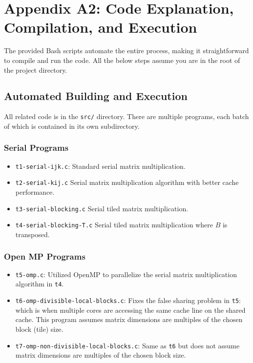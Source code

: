\documentclass{article}
\begin{document}
\section{Appendix A2: Code Explanation, Compilation, and Execution}

The provided Bash scripts automate the entire process, 
making it straightforward to compile and run the code. All the below steps assume 
you are in the root of the project directory.

\subsection{Automated Building and Execution}
All related code is in the \texttt{src/} directory.
There are multiple programs, each batch of which is contained in its own subdirectory.
\subsubsection*{Serial Programs}
\begin{itemize}
    \item \texttt{t1-serial-ijk.c}: Standard serial matrix multiplication.
    \item \texttt{t2-serial-kij.c} Serial matrix multiplication algorithm with better cache performance.
    \item \texttt{t3-serial-blocking.c} Serial tiled matrix multiplication.
    \item \texttt{t4-serial-blocking-T.c} Serial tiled matrix multiplication where $B$ is transposed.
\end{itemize}

\subsubsection*{Open MP Programs}
\begin{itemize}
    \item \texttt{t5-omp.c}: Utilized OpenMP to parallelize the serial matrix multiplication algorithm in \texttt{t4}.
    \item \texttt{t6-omp-divisible-local-blocks.c}: Fixes the false sharing problem in \texttt{t5}: which is when 
    multiple cores are accessing the same cache line on the shared cache. This program assumes 
    matrix dimensions are multiples of the chosen block (tile) size.
    \item \texttt{t7-omp-non-divisible-local-blocks.c}: Same as \texttt{t6} but does not assume matrix dimensions are multiples of the chosen block size.
\end{itemize}
\end{document}
